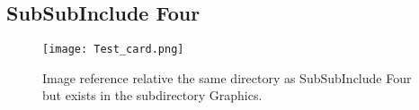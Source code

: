 \subsection{SubSubInclude Four}

\lipsum[8]

\begin{figure}%
    \centering
    \caption{Image reference relative the same directory as SubSubInclude Four but exists in the subdirectory Graphics.}
    \texttt{[image: Test\_card.png]}%
\end{figure}